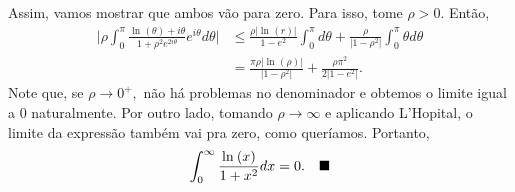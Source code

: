 \documentclass[complex.tex]{subfiles}
\begin{document}
\begin{exer*}
\[	\]
	Assim, vamos mostrar que ambos vão para zero. Para isso, tome \(\rho > 0\). Então,
	\begin{align*}
		\biggl\vert \rho \int_{0}^{\pi }\frac{\ln^{}{(\theta )} + i\theta }{1 + \rho ^{2}e^{2i\theta }}e^{i\theta }d\theta  \biggr\vert & \leq \frac{\rho |\ln^{}{(r)}|}{1-e^{2}}\int_{0}^{\pi }d\theta + \frac{\rho }{|1-\rho ^{2}|}\int_{0}^{\pi }\theta d\theta \\
		                                                                                                                                & = \frac{\pi \rho |\ln^{}{(\rho )}|}{|1-\rho ^{2}|} + \frac{\rho \pi ^{2}}{2|1-e^{2}|}.
	\end{align*}
	Note que, se \(\rho\to 0^{+},\) não há problemas no denominador e obtemos o limite igual a 0 naturalmente. Por outro lado, tomando
	\(\rho \to \infty\) e aplicando L'Hopital, o limite da expressão também vai pra zero, como queríamos. Portanto,
	\[
		\int_{0}^{\infty}\frac{\ln^{}{(x)}}{1 + x^{2}}dx = 0.\quad \text{$\blacksquare$}
	\]
\end{exer*}
\end{document}
